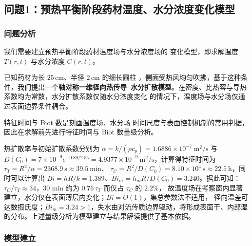 
\subsection{问题1：预热平衡阶段药材温度、水分浓度变化模型}

\subsubsection{问题分析}

我们需要建立预热平衡阶段药材温度场与水分浓度场的
变化模型，即求解温度 $T(r,t)$ 与水分浓度 $C(r,t)$。

已知药材为长 $25\,\mathrm{cm}$、半径 $2\,\mathrm{cm}$ 的细长圆柱
，侧面受热风均匀吹拂，基于这种条件，我们提出一个\textbf{轴对称一维径向热传导--水分扩散模型}。在密度、比热容与导热系数均为常数，水分扩散系数仅随水分浓度变化
的情况下，温度场与水分场仅通过表面边界条件耦合。

特征时间与 Biot 数是刻画温度场、水分场
时间尺度与表面控制机制的常用判据\cite{yan2026heat,srikiatden2007moisture}，因此在求解前先进行特征时间与 Biot 数量级分析。

热扩散率与初始扩散系数分别为 $\alpha=k/(\rho c_p)=1.6886\times10^{-7}\ \mathrm{m^2/s}$ 与
$D(C_0)=7\times10^{-9}e^{-0.89/2.55}=4.9377\times10^{-9}\ \mathrm{m^2/s}$，计算得特征时间为
$\tau_T=R^2/\alpha=2368.9\ \mathrm{s}\approx39.5\ \mathrm{min}$、
$\tau_C=R^2/D(C_0)=8.10\times10^{4}\ \mathrm{s}\approx22.5\ \mathrm{h}$，同时可以计算出
$Bi=hR/k=1.389$、$Bi_m=h_mR/D(C_0)=3.240$。据此可知：
$\tau_C/\tau_T\approx34$，30 min 约为 $0.76\,\tau_T$ 而仅占 $\tau_C$ 的 $2.2\%$，
故温度场在考察窗内显著建立，水分仅在表面薄层内变化；$Bi=O(1)$，集总参数法不适用，
径向温差可达数摄氏度；$Bi_m=3.24>1$，失水由对流传质边界驱动，将形成表面干、内部湿
的分布。上述量级分析为模型建立与结果解读提供了基本依据。

\subsubsection{模型建立}

